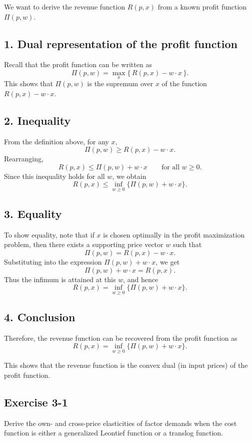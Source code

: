 We want to derive the revenue function \(R(p,x)\) from a known profit function \(\Pi(p,w)\).

\subsection*{1. Dual representation of the profit function}

Recall that the profit function can be written as
\[
\Pi(p,w)=\max_{x}\{\,R(p,x)-w\cdot x\,\}.
\]
This shows that \(\Pi(p,w)\) is the supremum over \(x\) of the function \(R(p,x)-w\cdot x\).

\subsection*{2. Inequality}

From the definition above, for any \(x\),
\[
\Pi(p,w)\ge R(p,x)-w\cdot x.
\]
Rearranging,
\[
R(p,x)\le \Pi(p,w)+w\cdot x
\qquad \text{for all } w\ge 0.
\]
Since this inequality holds for all \(w\), we obtain
\[
R(p,x)\le \inf_{w\ge 0}\{\Pi(p,w)+w\cdot x\}.
\]

\subsection*{3. Equality}

To show equality, note that if \(x\) is chosen optimally in the profit maximization problem, then there exists a supporting price vector \(w\) such that
\[
\Pi(p,w)=R(p,x)-w\cdot x.
\]
Substituting into the expression \(\Pi(p,w)+w\cdot x\), we get
\[
\Pi(p,w)+w\cdot x
=
R(p,x).
\]
Thus the infimum is attained at this \(w\), and hence
\[
R(p,x)=\inf_{w\ge 0}\{\Pi(p,w)+w\cdot x\}.
\]

\subsection*{4. Conclusion}

Therefore, the revenue function can be recovered from the profit function as
\[
\boxed{
R(p,x)=\inf_{w\ge 0}\{\Pi(p,w)+w\cdot x\}.
}
\]

This shows that the revenue function is the convex dual (in input prices) of the profit function.



\vspace{30pt}
\begin{tcolorbox}[breakable]

\subsection*{Exercise 3-1}

Derive the own- and cross-price elasticities of factor demands when the
cost function is either a generalized Leontief function or a translog function.

\end{tcolorbox}

